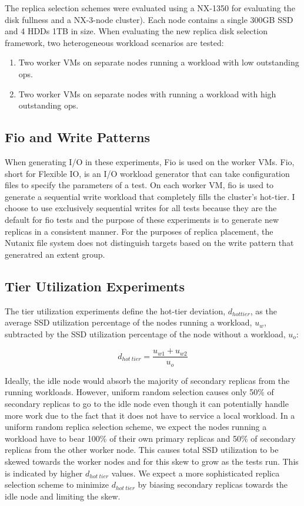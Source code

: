 \documentclass[12pt]{article}
\begin{document}
  The replica selection schemes were evaluated using a NX-1350 for evaluating
  the disk fullness and a NX-3-node cluster). Each node contains a single 300GB
  SSD and 4 HDDs 1TB in size. When evaluating the new replica disk selection
  framework, two heterogeneous workload scenarios are tested:
 
  \begin{enumerate}
    \item Two worker VMs on separate nodes running a workload with low
          outstanding ops.
    \item Two worker VMs on separate nodes with running a
          workload with high outstanding ops.
  \end{enumerate}
 
  \subsection{Fio and Write Patterns}

  When generating I/O in these experiments, Fio is used on the worker VMs. Fio,
  short for Flexible IO, is an I/O workload generator that can take
  configuration files to specify the parameters of a test. On each worker VM,
  fio is used to generate a sequential write workload that completely fills the
  cluster's hot-tier. I choose to use exclusively sequential writes for all
  tests because they are the default for fio tests and the purpose of these
  experiments is to generate new replicas in a consistent manner. For the
  purposes of replica placement, the Nutanix file system does not distinguish
  targets based on the write pattern that generatred an extent group.

  \subsection{Tier Utilization Experiments}

  The tier utilization experiments define the hot-tier deviation,
  $d_{hot tier}$, as the average SSD utilization percentage of the nodes
  running a workload, $u_{w}$, subtracted by the SSD utilization percentage of
  the node without a workload, $u_{o}$:
  
  \begin{equation}
    d_{hot\ tier} = \frac{u_{w1} + u_{w2}}{u_{o}}
  \end{equation}
  
  Ideally, the idle node would absorb the majority of secondary replicas from
  the running workloads. However, uniform random selection causes only 50\% of
  secondary replicas to go to the idle node even though it can potentially
  handle more work due to the fact that it does not have to service a local
  workload. In a uniform random replica selection scheme, we expect the
  nodes running a workload have to bear 100\% of their own primary replicas and
  50\% of secondary replicas from the other worker node. This causes total SSD
  utilization to be skewed towards the worker nodes and for this skew to grow
  as the tests run. This is indicated by higher $d_{hot\ tier}$ values. We
  expect a more sophisticated replica selection scheme to minimize
  $d_{hot\ tier}$ by biasing secondary replicas towards the idle node and
  limiting the skew.
\end{document}
